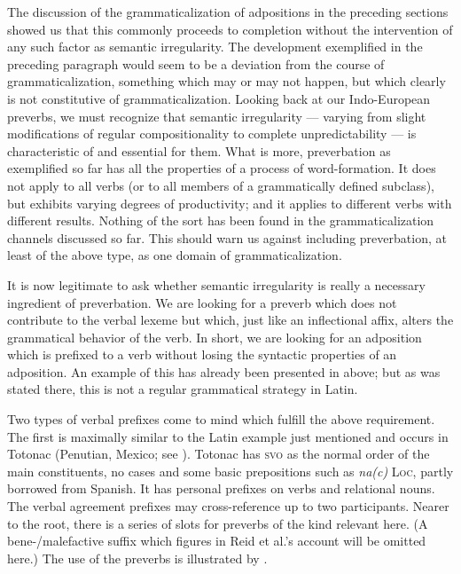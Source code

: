 The discussion of the grammaticalization of adpositions in the preceding sections showed us that this commonly proceeds to completion without the intervention of any such factor as semantic irregularity. The development exemplified in the preceding paragraph would seem to be a deviation from the course of grammaticalization, something which may or may not happen, but which clearly is not constitutive of grammaticalization. Looking back at our Indo-European preverbs, we must recognize that semantic irregularity — varying from slight modifications of regular compositionality to complete unpredictability — is characteristic of and essential for them. What is more, preverbation as exemplified so far has all the properties of a process of word-formation. It does not apply to all verbs (or to all members of a grammatically defined subclass), but exhibits varying degrees of productivity; and it applies to different verbs with different results. Nothing of the sort has been found in the grammaticalization channels discussed so far. This should warn us against including preverbation, at least of the above type, as one domain of grammaticalization.

It is now legitimate to ask whether semantic irregularity is really a necessary ingredient of preverbation. We are looking for a preverb which does not contribute to the verbal lexeme but which, just like an inflectional affix, alters the grammatical behavior of the verb. In short, we are looking for an adposition which is prefixed to a verb without losing the syntactic properties of an adposition. An example of this has already been presented in  above; but as was stated there, this is not a regular grammatical strategy in Latin.

Two types of verbal prefixes come to mind which fulfill the above requirement. The first is maximally similar to the Latin example just mentioned and occurs in Totonac (Penutian, Mexico; see \citealt[24--30]{Reid1968}). Totonac has \textsc{svo} as the normal order of the main constituents, no cases and some basic prepositions such as \textit{na(c)} \textsc{Loc}, partly borrowed from Spanish. It has personal prefixes on verbs and relational nouns. The verbal agreement prefixes may cross-reference up to two participants. Nearer to the root, there is a series of slots for preverbs of the kind relevant here. (A bene-/malefactive suffix which figures in Reid et al.'s account will be omitted here.) The use of the preverbs is illustrated by .


